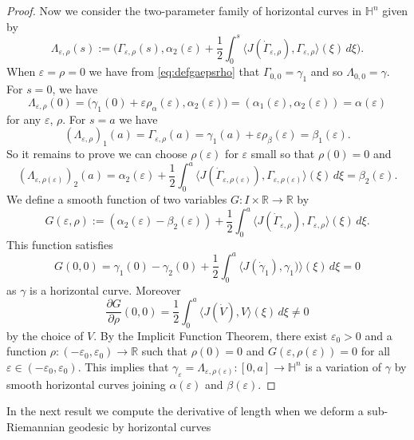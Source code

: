 \documentclass[10pt]{amsart}
\theoremstyle{definition}
\theoremstyle{remark}
\numberwithin{equation}{section}
\begin{document}
\begin{proof}
Now we consider the two-parameter family of horizontal curves in ${{\mathbb{H}}}^n$ given by
\begin{equation}
\Lambda_{{\varepsilon},\rho}(s):=\big({\Gamma}_{{\varepsilon},\rho}(s),\alpha_2({\varepsilon})+\frac{1}{2}\int_0^s{\langle{J(\dot{\Gamma}_{{\varepsilon},\rho}),{\Gamma}_{{\varepsilon},\rho}}\rangle}(\xi)\,d\xi\big).
\end{equation}
When ${\varepsilon}=\rho=0$ we have from \eqref{eq:defgaepsrho} that ${\Gamma}_{0,0}={\gamma}_1$ and so $\Lambda_{0,0}={\gamma}$. For $s=0$, we have
\[
\Lambda_{{\varepsilon},\rho}(0)=\big({\gamma}_1(0)+{\varepsilon}\rho_\alpha({\varepsilon}),\alpha_2({\varepsilon})\big)=(\alpha_1({\varepsilon}),\alpha_2({\varepsilon}))=\alpha({\varepsilon})
\]
for any ${\varepsilon}$, $\rho$. For $s=a$ we have
\[
(\Lambda_{{\varepsilon},\rho})_1(a)={\Gamma}_{{\varepsilon},\rho}(a)={\gamma}_1(a)+{\varepsilon}\rho_\beta({\varepsilon})=\beta_1({\varepsilon}).
\]
So it remains to prove we can choose $\rho({\varepsilon})$ for ${\varepsilon}$ small so that $\rho(0)=0$ and
\[
(\Lambda_{{\varepsilon},\rho({\varepsilon})})_2(a)=\alpha_2({\varepsilon})+\frac{1}{2}\int_0^a {\langle{J(\dot{\Gamma}_{{\varepsilon},\rho({\varepsilon})}),{\Gamma}_{{\varepsilon},\rho({\varepsilon})}}\rangle}(\xi)\,d\xi=\beta_2({\varepsilon}).
\]
We define a smooth function of two variables $G:I\times{{\mathbb{R}}}\to{{\mathbb{R}}}$ by
\[
G({\varepsilon},\rho):=(\alpha_2({\varepsilon})-\beta_2({\varepsilon}))+\frac{1}{2}\int_0^a{\langle{J(\dot{\Gamma}_{{\varepsilon},\rho}),{\Gamma}_{{\varepsilon},\rho}}\rangle}(\xi)\,d\xi.
\]
This function satisfies
\[
G(0,0)={\gamma}_1(0)-{\gamma}_2(0)+\frac{1}{2}\int_0^a{\langle{J(\dot{\gamma}_1),{\gamma}_1)}\rangle}(\xi)\,d\xi=0
\]
as ${\gamma}$ is a horizontal curve. Moreover
\[
\frac{{\partial} G}{{\partial}\rho}(0,0)=\frac{1}{2}\int_0^a{\langle{J(\dot{V}),V}\rangle}(\xi)\,d\xi\neq 0
\]
by the choice of $V$. By the Implicit Function Theorem, there exist ${\varepsilon}_0>0$ and a function $\rho:(-{\varepsilon}_0,{\varepsilon}_0)\to{{\mathbb{R}}}$ such that $\rho(0)=0$ and $G({\varepsilon},\rho({\varepsilon}))=0$ for all ${\varepsilon}\in (-{\varepsilon}_0,{\varepsilon}_0)$. This implies that ${\gamma}_{\varepsilon}=\Lambda_{{\varepsilon},\rho({\varepsilon})}:[0,a]\to{{\mathbb{H}}}^n$ is a variation of ${\gamma}$ by smooth horizontal curves joining $\alpha({\varepsilon})$ and $\beta({\varepsilon})$.
\end{proof}

In the next result we compute the derivative of length when we deform a sub-Riemannian geodesic by horizontal curves
\end{document}

